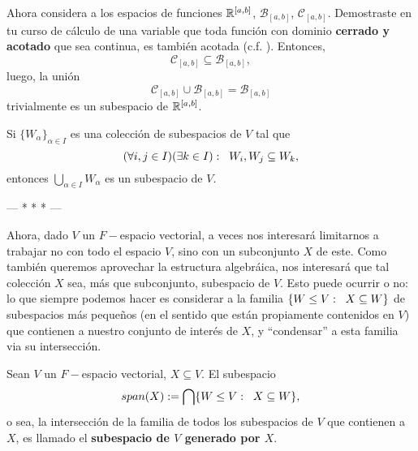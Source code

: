 \begin{ejem}
	\label{ej: subespacios funciones, dominio compacto}
	Ahora considera a los espacios de funciones 
	$\mathbb{R}^{[a, b]}$, $\mathcal{B}_{[a, b]}$, $\mathcal{C}_{[a, b]}$.
	Demostraste en tu curso de cálculo de una variable que toda
	función con dominio \textbf{cerrado y acotado} que sea continua,
	es también acotada (c.f. ). Entonces, 
	\[
	\mathcal{C}_{[a, b]} \subseteq \mathcal{B}_{[a, b]},
	\]
	luego, la unión
	\[
	\mathcal{C}_{[a, b]} \cup \mathcal{B}_{[a, b]} = \mathcal{B}_{[a, b]}
	\]
	trivialmente es un subespacio de $\mathbb{R}^{[a, b]}$.
\end{ejem}

 Si $\{ W_{\alpha} \}_{\alpha \in I}$
es una colección de subespacios de $V$ tal que
\[
(\forall i, j \in I)(\exists k \in I): \hspace{0.2cm}
W_{i}, W_{j} \subseteq W_{k},
\]
entonces $\bigcup_{\alpha \in I} W_{\alpha}$ es un subespacio de $V$.


 \begin{center}
 --- * * * ---
 \end{center}
Ahora, dado $V$ un $F-$espacio vectorial, a veces nos interesará
limitarnos a trabajar no con todo el espacio $V$, sino con un 
subconjunto $X$ de este. Como también queremos aprovechar
la estructura algebráica, nos interesará que tal colección $X$
sea, más que subconjunto, subespacio de $V$.
Esto puede ocurrir o no: lo que siempre podemos hacer
es considerar a la familia $\{ W \leq V : 
\hspace{0.2cm} X \subseteq W \}$ de subespacios más pequeños
(en el sentido que están propiamente contenidos en $V$)
que contienen a nuestro conjunto de interés de $X$, y 
``condensar'' a esta familia via su intersección.

\begin{defi}
Sean $V$ un $F-$espacio vectorial, $X \subseteq V$. 
El subespacio
\begin{equation}
	\label{eq: sub generado por X}
	span (X) := \bigcap \{ W \leq V : \hspace{0.2cm}
	X \subseteq W \},
\end{equation}
o sea, la intersección de la familia de todos los subespacios
de $V$ que contienen a $X$, es llamado el 
\textbf{subespacio de $V$ generado por $X$}.
\end{defi}

